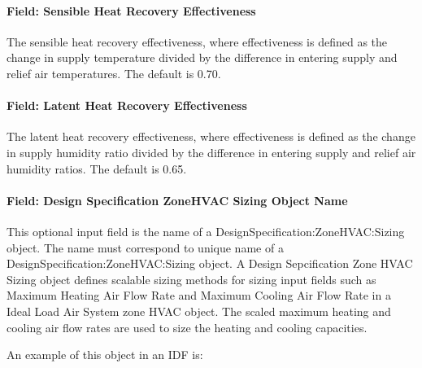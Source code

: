 \paragraph{Field: Sensible Heat Recovery Effectiveness}\label{field-sensible-heat-recovery-effectiveness-000}

The sensible heat recovery effectiveness, where effectiveness is defined as the change in supply temperature divided by the difference in entering supply and relief air temperatures. The default is 0.70.

\paragraph{Field: Latent Heat Recovery Effectiveness}\label{field-latent-heat-recovery-effectiveness-000}

The latent heat recovery effectiveness, where effectiveness is defined as the change in supply humidity ratio divided by the difference in entering supply and relief air humidity ratios. The default is 0.65.

\paragraph{Field: Design Specification ZoneHVAC Sizing Object Name}\label{field-design-specification-zonehvac-sizing-object-name-000}

This optional input field is the name of a DesignSpecification:ZoneHVAC:Sizing object. The name must correspond to unique name of a DesignSpecification:ZoneHVAC:Sizing object. A Design Sepcification Zone HVAC Sizing object defines scalable sizing methods for sizing input fields such as Maximum Heating Air Flow Rate and Maximum Cooling Air Flow Rate in a Ideal Load Air System zone HVAC object. The scaled maximum heating and cooling air flow rates are used to size the heating and cooling capacities.

An example of this object in an IDF is:

